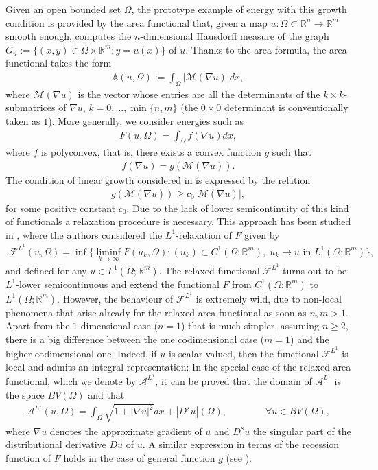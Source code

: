 \documentclass[a4paper,11pt]{article}
\numberwithin{equation}{section}
\newcommand{\Om}{\Omega}
\newcommand{\R}{\mathbb{R}}
\begin{document}
Given an open bounded set $\Omega$, the prototype example of energy with this growth condition is provided by the area functional that, given a map $u:\Om\subset\R^n\rightarrow \R^m$ smooth enough, computes the $n$-dimensional Hausdorff measure of the graph $G_u:=\{(x,y)\in \Om\times \R^m:y=u(x)\}$ of $u$. Thanks to the area formula, the area functional takes the form
\begin{align}
	\mathbb A(u,\Om):=\int_\Om|\mathcal M(\nabla u)|dx,
\end{align}  
where $\mathcal M(\nabla u)$ is the vector whose entries are all the determinants of the $k\times k$-submatrices of $\nabla u$, $k=0,\dots,\min\{n,m\}$ (the $0\times0$ determinant is conventionally taken as $1$). More generally, we consider energies such as 
\begin{align}\label{functionalF}
F(u,\Om)=\int_\Om f(\nabla u)dx,
\end{align}
where $f$ is polyconvex, that is, there exists a convex function $g$ such that 
\begin{align}\label{functionalF2}
	f(\nabla u)=g(\mathcal M(\nabla u)).
\end{align}
The condition of linear growth considered in \cite{ADM} is expressed by the relation
\begin{align}\label{growth_g}
g(\mathcal M(\nabla u))\geq c_0|\mathcal M(\nabla u)|,
\end{align}
for some positive constant $c_0$. 
Due to the lack of lower semicontinuity of this  kind of functionals a relaxation procedure is necessary. This approach has been studied  in \cite{ADM}, where the authors considered the $L^1$-relaxation of $F$ given by
\begin{align}\label{rel_L1}
\mathcal F^{L^1}(u,\Om)=\inf\{\liminf_{k\rightarrow\infty}F(u_k,\Om):(u_k)\subset C^1(\Om;\R^m),\;u_k\rightarrow u\text{ in }L^1(\Om;\R^m)\},
\end{align}
and defined for any $u\in L^1(\Om;\R^m)$. The relaxed functional $\mathcal F^{L^1}$ turns out to be $L^1$-lower semicontinuous and extend the functional $F$ from $C^1(\Om;\R^m)$ to $L^1(\Om;\R^m)$. However,  the behaviour of $\mathcal F^{L^1}$ is extremely wild, due to non-local phenomena that arise already for the relaxed area functional as soon as $n,m>1$. 
 Apart from the $1$-dimensional case ($n=1$) that is much simpler, assuming $n\geq2$, there is a big difference between the one codimensional case ($m=1$) and the higher codimensional one. Indeed, if $u$ is scalar valued, then the functional $\mathcal F^{L^1}$ is local and admits an integral representation: In the special case of the relaxed area functional, which we denote by $\mathcal A^{L^1}$, it can be proved that the domain of $  \mathcal A^{L^1}$ is the space $BV(\Om)$ and that
 \begin{align}
\mathcal A^{L^1}(u,\Om)=\int_\Om\sqrt{1+|\nabla u|^2}dx+|D^su|(\Om), \qquad \qquad \forall u\in BV(\Om),
 \end{align}
where $\nabla u$ denotes the approximate gradient of $u$ and $D^su$ the singular part of the distributional derivative $Du$ of $u$. A similar expression in terms of the recession function of $F$ holds in the  case of general function $g$ (see \cite{DalMaso:80}).
\end{document}
